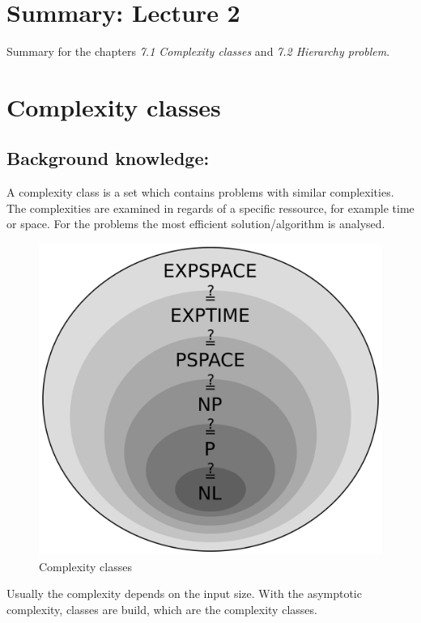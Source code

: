 \documentclass[a4]{scrartcl}
\begin{document}
\section*{Summary: Lecture 2}

Summary for the chapters \textit{7.1 Complexity classes} and \textit{7.2 Hierarchy problem}. \cite{book}


\section*{Complexity classes}

\subsection*{Background knowledge:}

A complexity class is a set which contains problems with similar complexities. The complexities are examined in regards of a specific ressource, for example time or space. For the problems the most efficient solution/algorithm is analysed.

\begin{figure}[H]
\begin{center}
\includegraphics[scale=0.15]{images/classes.png}
\end{center}
\caption{Complexity classes \cite{classesPic}}
\end{figure}

Usually the complexity depends on the input size. With the asymptotic complexity, classes are build, which are the complexity classes. \cite{GTI}
\end{document}

